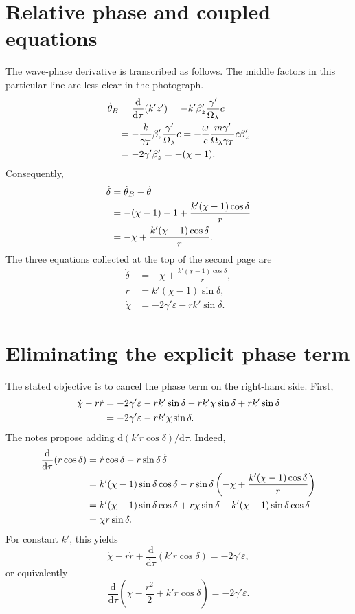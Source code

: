 \documentclass[11pt,a4paper]{article}
\newcommand{\dd}{\mathrm{d}}
\begin{document}
\newpage
\section{Relative phase and coupled equations}
The wave-phase derivative is transcribed as follows. The middle factors
in this particular line are less clear in the photograph.
\begin{align}
\dot\theta_B
&=\frac{\dd}{\dd\tau}(k'z')
=-k'\beta_z'\frac{\gamma'}{\Omega_\lambda}c\notag\\
&=-\frac{k}{\gamma_T}\beta_z'\frac{\gamma'}{\Omega_\lambda}c
=-\frac{\omega}{c}\frac{m\gamma'}{\Omega_\lambda\gamma_T}c\beta_z'
\notag\\
&=-2\gamma'\beta_z'=-(\chi-1).
\end{align}
Consequently,
\begin{align}
\dot\delta&=\dot\theta_B-\dot\theta\notag\\
&=-(\chi-1)-1+\frac{k'(\chi-1)\cos\delta}{r}\notag\\
&=-\chi+\frac{k'(\chi-1)\cos\delta}{r}.
\end{align}
The three equations collected at the top of the second page are
\begin{equation}
\boxed{\begin{aligned}
\dot\delta&=-\chi+\frac{k'(\chi-1)\cos\delta}{r},\\
\dot r&=k'(\chi-1)\sin\delta,\\
\dot\chi&=-2\gamma'\varepsilon-rk'\sin\delta.
\end{aligned}}
\label{eq:system}
\end{equation}

\section{Eliminating the explicit phase term}
The stated objective is to cancel the phase term on the right-hand side.
First,
\begin{align}
\dot\chi-r\dot r
&=-2\gamma'\varepsilon-rk'\sin\delta
-rk'\chi\sin\delta+rk'\sin\delta\notag\\
&=-2\gamma'\varepsilon-rk'\chi\sin\delta.
\end{align}
The notes propose adding $\dd(k'r\cos\delta)/\dd\tau$.
Indeed,
\begin{align}
\frac{\dd}{\dd\tau}(r\cos\delta)
&=\dot r\cos\delta-r\sin\delta\,\dot\delta\notag\\
&=k'(\chi-1)\sin\delta\cos\delta
-r\sin\delta\left(-\chi+\frac{k'(\chi-1)\cos\delta}{r}\right)
\notag\\
&=k'(\chi-1)\sin\delta\cos\delta+r\chi\sin\delta
-k'(\chi-1)\sin\delta\cos\delta\notag\\
&=\chi r\sin\delta.
\end{align}
For constant $k'$, this yields
\begin{equation}
\dot\chi-r\dot r+\frac{\dd}{\dd\tau}(k'r\cos\delta)
=-2\gamma'\varepsilon,
\end{equation}
or equivalently
\begin{equation}
\boxed{\frac{\dd}{\dd\tau}
\left(\chi-\frac{r^2}{2}+k'r\cos\delta\right)
=-2\gamma'\varepsilon.}
\end{equation}
\end{document}
